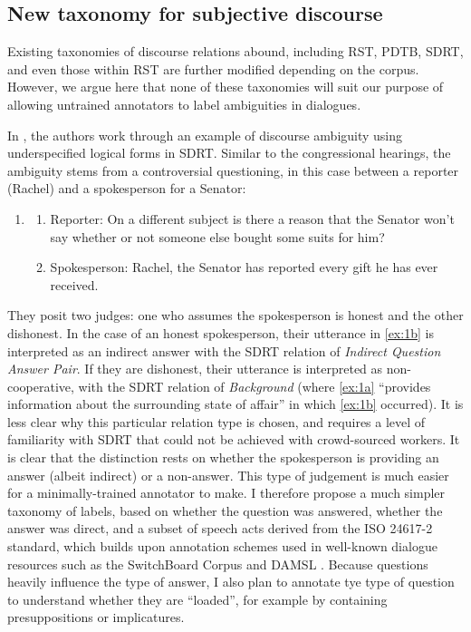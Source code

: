 \subsection{New taxonomy for subjective discourse}
Existing taxonomies of discourse relations abound, including RST, PDTB, SDRT, and even those within RST are further modified depending on the corpus. However, we argue here that none of these taxonomies will suit our purpose of allowing untrained annotators to label ambiguities in dialogues.

In \cite{Asher:2018}, the authors work through an example of discourse ambiguity using underspecified logical forms in SDRT. Similar to the congressional hearings, the ambiguity stems from a controversial questioning, in this case between a reporter (Rachel) and a spokesperson for a Senator:

\begin{enumerate}
\item \label{ex:1}
\begin{enumerate}
\setlength\itemsep{0em}
 \item Reporter: On a different subject is there a reason that the Senator won’t say whether or not someone else bought some suits for him? \label{ex:1a}
\item Spokesperson: Rachel, the Senator has reported every gift he has ever received. \label{ex:1b}
\end{enumerate}
\end{enumerate}

They posit two judges: one who assumes the spokesperson is honest and the other dishonest. In the case of an honest spokesperson, their utterance in \ref{ex:1b} is interpreted as an indirect answer with the SDRT relation of \emph{Indirect Question Answer Pair}. If they are dishonest, their utterance is interpreted as non-cooperative, with the SDRT relation of \emph{Background} (where \ref{ex:1a} ``provides information about the surrounding state of affair'' in which \ref{ex:1b} occurred). It is less clear why this particular relation type is chosen, and requires a level of familiarity with SDRT that could not be achieved with crowd-sourced workers. It is clear that the distinction rests on whether the spokesperson is providing an answer (albeit indirect) or a non-answer. This type of judgement is much easier for a minimally-trained annotator to make. I therefore propose a much simpler taxonomy of labels, based on whether the question was answered, whether the answer was direct, and a subset of speech acts derived from the ISO 24617-2 standard, which builds upon annotation schemes used in well-known dialogue resources such as the SwitchBoard Corpus and DAMSL \citep{Bunt:2018}. Because questions heavily influence the type of answer, I also plan to annotate tye type of question to understand whether they are ``loaded'', for example by containing presuppositions or implicatures. 

